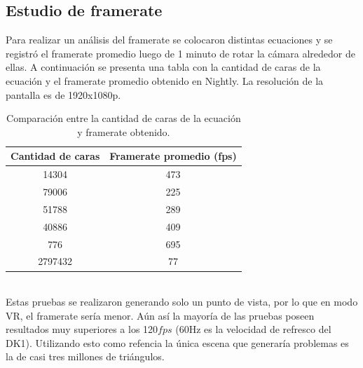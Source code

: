 \documentclass[12pt]{article}
\begin{document}
\subsection{ Estudio de framerate}
Para realizar un análisis del framerate se colocaron distintas ecuaciones y se registró el framerate promedio luego de 1 minuto de rotar la cámara alrededor de ellas. A continuación se presenta una tabla con la cantidad de caras de la ecuación y el framerate promedio obtenido en Nightly. La resolución de la pantalla es de 1920x1080p.
\begin{table}[h!]
  \centering
  \label{tab:table1}
  \begin{tabular}{cc}
    \toprule
    Cantidad de caras & Framerate promedio (fps)\\
    \midrule
    14304 & 473\\
    79006 & 225\\
    51788 & 289\\
    40886&409\\
    776&695\\
    2797432&77\\
    \bottomrule
  \end{tabular}
  \caption{Comparación entre la cantidad de caras de la ecuación y framerate obtenido.}
\end{table}
\\Estas pruebas se realizaron generando solo un punto de vista, por lo que en modo VR, el framerate sería menor. Aún así la mayoría de las pruebas poseen resultados muy superiores a los 120$fps$ (60Hz es la velocidad de refresco del DK1). Utilizando esto como refencia la única escena que generaría problemas es la de casi tres millones de triángulos.
\end{document}
